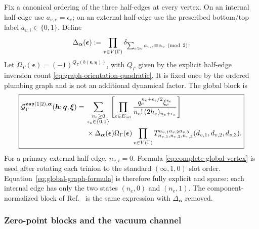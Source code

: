 \documentclass[11pt]{article}
\newcommand{\osp}{\mathfrak{osp}(1|2)}
\newcommand{\G}{\mathcal G}
\begin{document}
Fix a canonical ordering of the three half-edges at every vertex.  On an
internal half-edge use \(a_{v,e}=\epsilon_e\); on an external half-edge use
the prescribed bottom/top label \(a_{v,i}\in\{0,1\}\).  Define
\begin{equation}
 \Delta_{\bm\alpha}(\bm\epsilon)
 :=\prod_{v\in V(\Gamma)}
 \delta_{\sum_{e\ni v}a_{v,e}\equiv\alpha_v\ ({\rm mod}\ 2)}.
 \label{eq:graph-parity-projector}
\end{equation}
Let
\(\Omega_\Gamma(\bm\epsilon)=
(-1)^{Q_\Gamma(b(\bm\epsilon,\bm\eta))}\), with \(Q_\Gamma\) given by the
explicit half-edge inversion count
\eqref{eq:graph-orientation-quadratic}.  It is fixed once by the ordered
plumbing graph and is not an additional dynamical factor.
The global block is
\begin{equation}
\boxed{
\begin{aligned}
 \G_{\Gamma}^{\osp,\bm\alpha}
 (\bm h;\bm q,\bm\xi)
 ={}&\sum_{\substack{n_e\ge0\\\epsilon_e\in\{0,1\}}}
 \left[
  \prod_{e\in E_{\rm int}}
  \frac{
   q_e^{n_e+\epsilon_e/2}\xi_e^{\epsilon_e}}
   {n_e!\,(2h_e)_{n_e+\epsilon_e}}
 \right]
 \\
 &\times
 \Delta_{\bm\alpha}(\bm\epsilon)
 \Omega_\Gamma(\bm\epsilon)
 \prod_{v\in V(\Gamma)}
 T_{n_{v,1},n_{v,2},n_{v,3}}^
   {a_{v,1}a_{v,2}a_{v,3}}
 (d_{v,1},d_{v,2},d_{v,3}).
\end{aligned}}
\label{eq:global-graph-formula}
\end{equation}
For a primary external half-edge, \(n_{v,i}=0\).  Formula
\eqref{eq:complete-global-vertex} is used after rotating each trinion to the
standard \((\infty,1,0)\) slot order.  Equation~\eqref{eq:global-graph-formula}
is therefore fully explicit and sparse: each internal edge has only the two
states \((n_e,0)\) and \((n_e,1)\).  The component-normalized block of
Ref.~\cite{BelavinGeiko2018CRecursion} is the same expression with
\(\Delta_{\bm\alpha}\) removed.

\subsubsection{Zero-point blocks and the vacuum channel}
\end{document}
